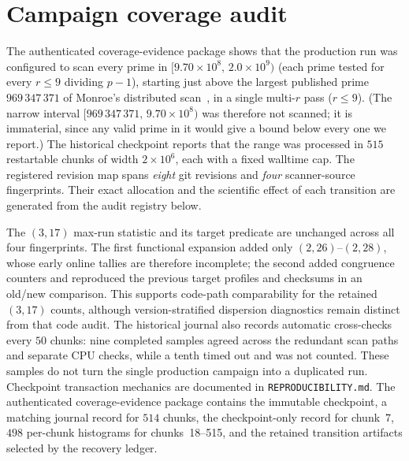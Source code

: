 \section{Campaign coverage audit}\label{s:campaign-audit}

The authenticated coverage-evidence package shows that the production run was
configured to scan every prime in
$[9.70\times 10^{8},\, 2.0\times 10^{9})$ (each prime tested for every
$r\le 9$ dividing $p-1$), starting just above the largest
published prime $969\,347\,371$ of Monroe's distributed scan~\cite{Monroe2026},
in a single multi-$r$ pass ($r\le 9$). (The narrow interval
$[969\,347\,371,\,9.70\times10^{8})$ was therefore not scanned; it is immaterial,
since any valid prime in it would give a bound below every one we report.) The
historical checkpoint reports that the range was processed in $515$
restartable chunks of width $2\times 10^{6}$, each with a fixed walltime cap.
The registered revision map spans \emph{eight} git revisions and \emph{four}
scanner-source fingerprints.  Their exact allocation and the scientific
effect of each transition are generated from the audit registry below.

The $(3,17)$ max-run statistic and its target predicate are unchanged across
all four fingerprints.  The first functional expansion added only
$(2,26)$--$(2,28)$, whose early online tallies are therefore incomplete; the
second added congruence counters and reproduced the previous target profiles
and checksums in an old/new comparison.  This supports code-path
comparability for the retained $(3,17)$ counts, although version-stratified
dispersion diagnostics remain distinct from that code audit.  The historical
journal also records automatic cross-checks every $50$ chunks: nine completed
samples agreed across the redundant scan paths and separate CPU checks, while a
tenth timed out and was not counted.  These samples do not turn the single
production campaign into a duplicated run.  Checkpoint transaction mechanics
are documented in \texttt{REPRODUCIBILITY.md}.  The authenticated
coverage-evidence package contains the immutable checkpoint, a matching journal
record for $514$ chunks, the checkpoint-only record for chunk~7, $498$
per-chunk histograms for chunks~18--515, and the retained transition artifacts
selected by the recovery ledger.

